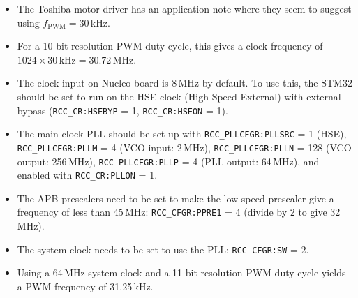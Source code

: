 \documentclass[a4paper,11pt,article]{memoir}
\begin{document}
\begin{itemize}
  \item{The Toshiba motor driver has an application note where they
    seem to suggest using $f_{\mathrm{PWM}} = 30\,\mathrm{kHz}$.}
  \item{For a 10-bit resolution PWM duty cycle, this gives a clock
    frequency of $1024 \times 30\,\mathrm{kHz} = 30.72\,\mathrm{MHz}$.}
  \item{The clock input on Nucleo board is 8\,MHz by default. To use
    this, the STM32 should be set to run on the HSE clock (High-Speed
    External) with external bypass (\texttt{RCC\_CR:HSEBYP} = 1,
    \texttt{RCC\_CR:HSEON} = 1).}
  \item{The main clock PLL should be set up with
    \texttt{RCC\_PLLCFGR:PLLSRC} = 1 (HSE), \texttt{RCC\_PLLCFGR:PLLM}
    = 4 (VCO input: 2\,MHz), \texttt{RCC\_PLLCFGR:PLLN} = 128 (VCO
    output: 256\,MHz), \texttt{RCC\_PLLCFGR:PLLP} = 4 (PLL output:
    64\,MHz), and enabled with \texttt{RCC\_CR:PLLON} = 1.}
  \item{The APB prescalers need to be set to make the low-speed
    prescaler give a frequency of less than 45\,MHz:
    \texttt{RCC\_CFGR:PPRE1} = 4 (divide by 2 to give 32\,MHz).}
  \item{The system clock needs to be set to use the PLL:
    \texttt{RCC\_CFGR:SW} = 2.}
  \item{Using a 64\,MHz system clock and a 11-bit resolution PWM duty
    cycle yields a PWM frequency of 31.25\,kHz.}
\end{itemize}
\end{document}
